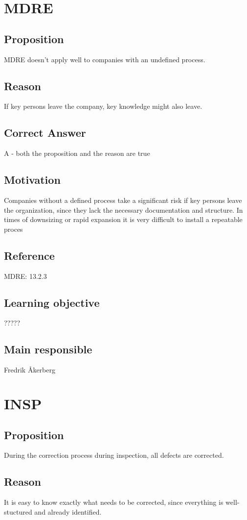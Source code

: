 \documentclass[a4paper]{article}
\begin{document}
\section{MDRE}
\subsection*{Proposition}
MDRE doesn't apply well to companies with an undefined process.
\subsection*{Reason}
If key persons leave the company, key knowledge might also leave.
\subsection*{Correct Answer}
A - both the proposition and the reason are true
\subsection*{Motivation}
Companies without a defined process take a significant risk if key persons leave the organization, since they lack the necessary documentation and structure. In times of downsizing or rapid expansion it is very difficult to install a repeatable proces
\subsection*{Reference}
MDRE: 13.2.3
\subsection*{Learning objective}
?????
\subsection*{Main responsible}
 Fredrik Åkerberg


\section{INSP}
\subsection*{Proposition}
During the correction process during inspection, all defects are corrected.
\subsection*{Reason}
 It is easy to know exactly what needs to be corrected, since everything is well-stuctured and already identified.
\end{document}
